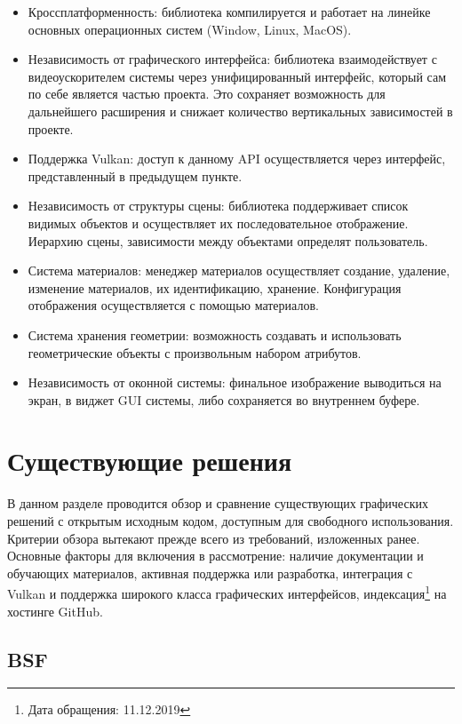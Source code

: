 \documentclass[14pt]{matmex-diploma}
\begin{document}
\begin{itemize}
    \item Кроссплатформенность: библиотека компилируется и работает на линейке основных операционных систем (Window, Linux, MacOS).
    \item Независимость от графического интерфейса: библиотека взаимодействует с видеоускорителем системы через унифицированный интерфейс, который сам по себе является частью проекта. Это сохраняет возможность для дальнейшего расширения и снижает количество вертикальных зависимостей в проекте.
    \item Поддержка Vulkan: доступ к данному API осуществляется через интерфейс, представленный в предыдущем пункте. 
    \item Независимость от структуры сцены: библиотека поддерживает список видимых объектов и осуществляет их последовательное отображение. Иерархию сцены, зависимости между объектами определят пользователь. 
    \item Система материалов: менеджер материалов осуществляет создание, удаление, изменение материалов, их идентификацию, хранение. Конфигурация отображения осуществляется с помощью материалов.
    \item Система хранения геометрии: возможность создавать и использовать геометрические объекты с произвольным набором атрибутов. 
    \item Независимость от оконной системы: финальное изображение выводиться на экран, в виджет GUI системы, либо сохраняется во внутреннем буфере.
\end{itemize}


\section{Существующие решения}
    
В данном разделе проводится обзор и сравнение существующих графических решений с открытым исходным кодом, доступным для свободного использования. Критерии обзора вытекают прежде всего из требований, изложенных ранее. Основные факторы для включения в рассмотрение: наличие документации и обучающих материалов, активная поддержка или разработка, интеграция с Vulkan и поддержка широкого класса графических интерфейсов, индексация\footnote{Дата обращения: 11.12.2019} на хостинге GitHub.

\subsection{BSF}
\end{document}
